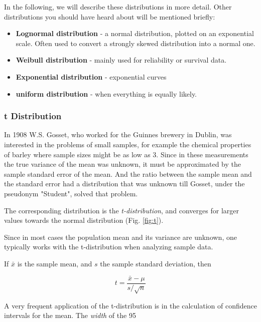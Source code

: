 In the following, we will describe these distributions in more detail. Other distributions you should have heard about will be mentioned briefly:

\begin{itemize}
  \item \textbf{Lognormal distribution} - a normal distribution, plotted on an exponential scale. Often used to convert a strongly skewed distribution into a normal one.
  \item \textbf{Weibull distribution} - mainly used for reliability or survival data.
  \item \textbf{Exponential distribution} - exponential curves
  \item \textbf{uniform distribution} - when everything is equally likely.
\end{itemize}

\subsubsection{t Distribution}

In 1908 W.S. Gosset, who worked for the Guinnes brewery in Dublin, was interested in the problems of small samples, for example the chemical properties of barley where sample sizes might be as low as 3. Since in these measurements the true variance of the mean was unknown, it must be approximated by the sample standard error of the mean. And the ratio between the sample mean and the standard error had a distribution that was unknown till Gosset, under the  pseudonym "Student", solved that problem.

The corresponding distribution is the \emph{t-distribution}, and converges for larger values towards the normal distribution (Fig. \ref{fig:t}).

Since in most cases the population mean and its variance are unknown, one typically works with the t-distribution when analyzing sample data.

If $\bar{x}$ is the sample mean, and $s$ the sample standard deviation, then

\begin{equation}
  t = \frac{\bar{x}-\mu}{s/ \sqrt{n}}
\end{equation}\label{eq:Tdistribution}

A very frequent application of the t-distribution is in the calculation of confidence intervals for the mean. The \emph{width }of the 95%

